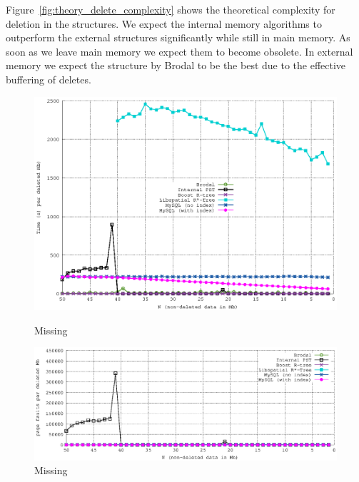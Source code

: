 \documentclass[twoside,11pt,openright]{report}
\begin{document}
Figure~\ref{fig:theory_delete_complexity} shows the theoretical complexity for deletion in the structures. We expect the internal memory algorithms to outperform the external structures significantly while still in main memory. As soon as we leave main memory we expect them to become obsolete. In external memory we expect the structure by Brodal to be the best due to the effective buffering of deletes.

\begin{figure}[htp!]
\centering
\includegraphics[width=\textwidth]{../src/experiments/delete_experiment_results/2016-05-27.10_10_14/time2}
\caption{Missing}
\label{fig:delete_complexity_result}
\includegraphics[width=\textwidth]{../src/experiments/delete_experiment_results/2016-05-27.10_10_14/pfs2}
\caption{Missing}
\label{fig:delete_complexity_result}
\end{figure}
\end{document}
